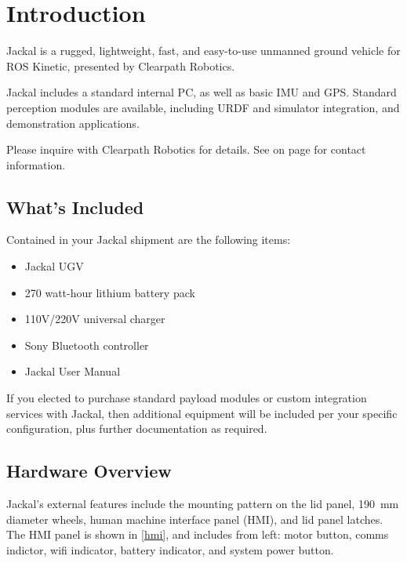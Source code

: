 \documentclass[]{clearpath-latex/clearpath-manual}
\begin{document}
\tableofcontents

\section{Introduction}

Jackal is a rugged, lightweight, fast, and easy-to-use unmanned ground vehicle for ROS
Kinetic, presented by Clearpath Robotics.

Jackal includes a standard internal PC, as well as basic IMU and GPS. Standard
perception modules are available, including URDF and simulator integration, and
demonstration applications.

Please inquire with Clearpath Robotics for details. See  on page
\pageref{contact} for contact information.

\subsection{What's Included}

Contained in your Jackal shipment are the following items:

\begin{itemize}[nolistsep]
  \item Jackal UGV
  \item 270 watt-hour lithium battery pack
  \item 110V/220V universal charger
  \item Sony Bluetooth controller
  \item Jackal User Manual
\end{itemize}

If you elected to purchase standard payload modules or custom integration services with
Jackal, then additional equipment will be included per your specific configuration, plus
further documentation as required.

\subsection{Hardware Overview}

Jackal's external features include the mounting pattern on the lid panel, \SI{190}{\mm} diameter
wheels, human machine interface panel (HMI), and lid panel latches. The HMI panel is shown in
\autoref{hmi}, and includes from left: motor button, comms indictor, wifi indicator, battery
indicator, and system power button.

\end{document}
